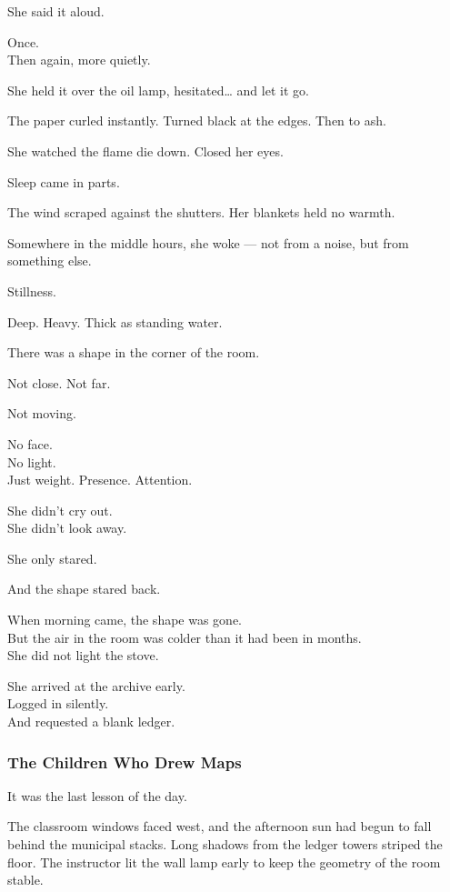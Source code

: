 \documentclass[12pt]{article}
\begin{document}
She said it aloud.

Once.\\
Then again, more quietly.

She held it over the oil lamp, hesitated… and let it go.

The paper curled instantly. Turned black at the edges. Then to ash.

She watched the flame die down. Closed her eyes.

\vspace{1em}

Sleep came in parts.

The wind scraped against the shutters. Her blankets held no warmth.

Somewhere in the middle hours, she woke --- not from a noise, but from something else.

Stillness.

Deep. Heavy. Thick as standing water.

There was a shape in the corner of the room.

Not close. Not far.

Not moving.

No face.\\
No light.\\
Just weight. Presence. Attention.

She didn’t cry out.\\
She didn’t look away.

She only stared.

And the shape stared back.

\vspace{1em}

When morning came, the shape was gone.\\
But the air in the room was colder than it had been in months.\\
She did not light the stove.

She arrived at the archive early.\\
Logged in silently.\\
And requested a blank ledger.

\dotfill

\subsubsection{The Children Who Drew Maps}

It was the last lesson of the day.

The classroom windows faced west, and the afternoon sun had begun to fall behind the municipal stacks. Long shadows from the ledger towers striped the floor. The instructor lit the wall lamp early to keep the geometry of the room stable.
\end{document}
